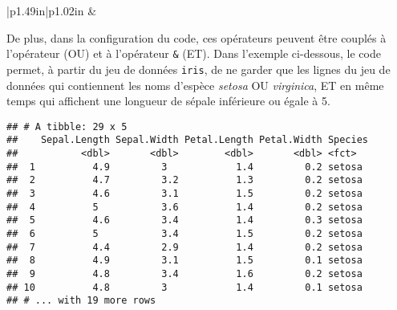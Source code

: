 \documentclass[
  french,
]{book}
\newenvironment{Shaded}{\begin{snugshade}}{\end{snugshade}}
\newcommand{\DecValTok}[1]{\textcolor[rgb]{0.00,0.00,0.81}{#1}}
\newcommand{\KeywordTok}[1]{\textcolor[rgb]{0.13,0.29,0.53}{\textbf{#1}}}
\newcommand{\NormalTok}[1]{#1}
\newcommand{\OperatorTok}[1]{\textcolor[rgb]{0.81,0.36,0.00}{\textbf{#1}}}
\newcommand{\StringTok}[1]{\textcolor[rgb]{0.31,0.60,0.02}{#1}}
\begin{document}
\begin{longtable}[c]{|p{1.49in}|p{1.02in}}
 &  \\




\end{longtable}

De plus, dans la configuration du code, ces opérateurs peuvent être couplés à l'opérateur \texttt{\textbar{}} (OU) et à l'opérateur \texttt{\&} (ET). Dans l'exemple ci-dessous, le code permet, à partir du jeu de données \texttt{iris}, de ne garder que les lignes du jeu de données qui contiennent les noms d'espèce \emph{setosa} OU \emph{virginica}, ET en même temps qui affichent une longueur de sépale inférieure ou égale à 5.

\begin{Shaded}
\end{Shaded}

\begin{verbatim}
## # A tibble: 29 x 5
##    Sepal.Length Sepal.Width Petal.Length Petal.Width Species
##           <dbl>       <dbl>        <dbl>       <dbl> <fct>  
##  1          4.9         3            1.4         0.2 setosa 
##  2          4.7         3.2          1.3         0.2 setosa 
##  3          4.6         3.1          1.5         0.2 setosa 
##  4          5           3.6          1.4         0.2 setosa 
##  5          4.6         3.4          1.4         0.3 setosa 
##  6          5           3.4          1.5         0.2 setosa 
##  7          4.4         2.9          1.4         0.2 setosa 
##  8          4.9         3.1          1.5         0.1 setosa 
##  9          4.8         3.4          1.6         0.2 setosa 
## 10          4.8         3            1.4         0.1 setosa 
## # ... with 19 more rows
\end{verbatim}
\end{document}
